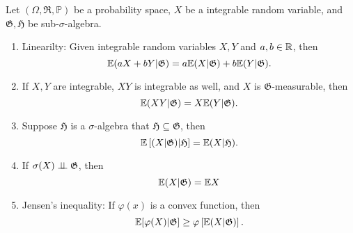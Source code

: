 \begin{theorem}
Let $(\Omega,\mathfrak{R},\mathbb{P})$ be a probability space, $X$ be a integrable random variable, and $\mathfrak{G,H}$ be sub-$\sigma$-algebra.
\begin{enumerate}
\item Linearilty: Given integrable random variables $X,Y$ and $a,b\in\mathbb{R}$, then
\begin{equation}
\mathbb{E}(aX+bY|\mathfrak{G})=a\mathbb{E}(X|\mathfrak{G})+b\mathbb{E}(Y|\mathfrak{G}).
\end{equation}
\item If $X,Y$ are integrable, $XY$ is integrable as well, and $X$ is $\mathfrak{G}$-measurable, then 
\begin{equation}
\mathbb{E}(XY|\mathfrak{G})=X\mathbb{E}(Y|\mathfrak{G}).
\end{equation}
\item Suppose $\mathfrak{H}$ is a $\sigma$-algebra that $\mathfrak{H}\subseteq\mathfrak{G}$, then
\begin{equation}
\mathbb{E}\left[(X|\mathfrak{G})|\mathfrak{H}\right]=\mathbb{E}(X|\mathfrak{H}).
\end{equation}
\item If $\sigma(X)\perp\!\!\!\perp\mathfrak{G}$, then
\begin{equation}
\mathbb{E}(X|\mathfrak{G})=\mathbb{E} X
\end{equation}
\item Jensen's inequality: If $\varphi(x)$ is a convex function, then
\begin{equation}
\mathbb{E}[\varphi(X)|\mathfrak{G}]\ge\varphi\left[\mathbb{E}(X|\mathfrak{G})\right].
\end{equation}
\end{enumerate}
\end{theorem}
